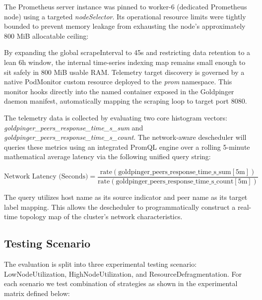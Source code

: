The Prometheus server instance was pinned to worker-6 (dedicated Prometheus node) using a targeted \emph{nodeSelector}. Its operational resource limits were tightly bounded to prevent memory leakage from exhausting the node's approximately 800 MiB allocatable ceiling:



By expanding the global scrapeInterval to 45s and restricting data retention to a lean 6h window, the internal time-series indexing map remains small enough to sit safely in 800 MiB usable RAM. Telemetry target discovery is governed by a native PodMonitor custom resource deployed to the \emph{prom} namespace. This monitor hooks directly into the named container exposed in the Goldpinger daemon manifest, automatically mapping the scraping loop to target port 8080.

The telemetry data is collected by evaluating two core histogram vectors: \textit{goldpinger\_peers\_response\_time\_s\_sum} and \textit{goldpinger\_peers\_response\_time\_s\_count}. The network-aware descheduler will queries these metrics using an integrated PromQL engine over a rolling 5-minute mathematical average latency via the following unified query string:

\[
\text{Network Latency (Seconds)} = \frac{\text{rate}(\text{goldpinger\_peers\_response\_time\_s\_sum}[5\text{m}])}{\text{rate}(\text{goldpinger\_peers\_response\_time\_s\_count}[5\text{m}])} 
\]

The query utilizes host name as its source indicator and peer name as its target label mapping. This allows the descheduler to programmatically construct a real-time topology map of the cluster's network characteristics.


\subsection{Testing Scenario}
\label{subsec:netaware4_experimentalmatrix}
The evaluation is split into three experimental testing scenario: LowNodeUtilization, HighNodeUtilization, and ResourceDefragmentation. For each scenario we test combination of strategies as shown in the experimental matrix defined below:

